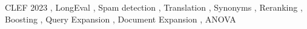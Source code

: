 \documentclass{ceurart}
\begin{document}
\begin{keywords}
  CLEF 2023 \sep
  LongEval \sep
  Spam detection \sep
  Translation \sep
  Synonyms \sep
  Reranking \sep
  Boosting \sep
  Query Expansion \sep
  Document Expansion \sep
  ANOVA
\end{keywords}

\maketitle













\end{document}

